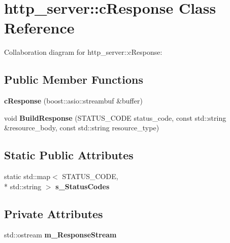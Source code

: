 \hypertarget{classhttp__server_1_1cResponse}{\section{http\-\_\-server\-:\-:c\-Response Class Reference}
\label{classhttp__server_1_1cResponse}
}


Collaboration diagram for http\-\_\-server\-:\-:c\-Response\-:
\subsection*{Public Member Functions}
\begin{DoxyCompactItemize}
\item 
\hypertarget{classhttp__server_1_1cResponse_abdb27671f4818f6e6bcbc11530d18ebc}{{\bfseries c\-Response} (boost\-::asio\-::streambuf \&buffer)}\label{classhttp__server_1_1cResponse_abdb27671f4818f6e6bcbc11530d18ebc}

\item 
\hypertarget{classhttp__server_1_1cResponse_a4643375b14534fa335154c7a88884228}{void {\bfseries Build\-Response} (S\-T\-A\-T\-U\-S\-\_\-\-C\-O\-D\-E status\-\_\-code, const std\-::string \&resource\-\_\-body, const std\-::string resource\-\_\-type)}\label{classhttp__server_1_1cResponse_a4643375b14534fa335154c7a88884228}

\end{DoxyCompactItemize}
\subsection*{Static Public Attributes}
\begin{DoxyCompactItemize}
\item 
static std\-::map$<$ S\-T\-A\-T\-U\-S\-\_\-\-C\-O\-D\-E, \\*
std\-::string $>$ {\bfseries s\-\_\-\-Status\-Codes}
\end{DoxyCompactItemize}
\subsection*{Private Attributes}
\begin{DoxyCompactItemize}
\item 
\hypertarget{classhttp__server_1_1cResponse_a26980e4d210c8f2e766d3ae987262160}{std\-::ostream {\bfseries m\-\_\-\-Response\-Stream}}\label{classhttp__server_1_1cResponse_a26980e4d210c8f2e766d3ae987262160}

\end{DoxyCompactItemize}


